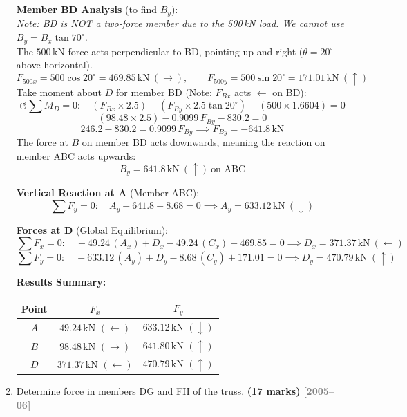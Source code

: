 \documentclass[12pt,a3paper]{article}
\newcommand{\yr}[1]{\hfill\textcolor{gray}{\small\textbf{[#1]}}}
\newcommand{\mk}[1]{\textcolor{orange!70!black}{\small\textbf{(#1 marks)}}}
\begin{document}
\begin{enumerate}
\begin{tcolorbox}[enhanced,breakable,ansbox,colback=cE!4,colframe=cE,
  boxrule=0.8pt,arc=5pt,
  title={\textbf{Corrected Solution}},fonttitle=\bfseries\color{white},colbacktitle=cE]
\medskip
\textbf{Member BD Analysis} (to find $B_y$): \\
\textit{Note: BD is NOT a two-force member due to the 500\,kN load. We cannot use $B_y = B_x \tan 70^\circ$.} \\
The $500$\,kN force acts perpendicular to BD, pointing up and right ($\theta = 20^\circ$ above horizontal).
\[
  F_{500x} = 500 \cos 20^\circ = 469.85\,\text{kN}\ (\rightarrow), \qquad
  F_{500y} = 500 \sin 20^\circ = 171.01\,\text{kN}\ (\uparrow)
\]
Take moment about $D$ for member BD (Note: $F_{Bx}$ acts $\leftarrow$ on BD):
\[
  \circlearrowleft \sum M_D = 0\colon\quad
  (F_{Bx} \times 2.5) - (F_{By} \times 2.5\tan 20^\circ) - (500 \times 1.6604) = 0
\]
\[
  (98.48 \times 2.5) - 0.9099\,F_{By} - 830.2 = 0
\]
\[
  246.2 - 830.2 = 0.9099\,F_{By} \implies F_{By} = -641.8\,\text{kN}
\]
The force at $B$ on member BD acts downwards, meaning the reaction on member ABC acts upwards:
\[
   \boxed{B_y = 641.8\,\text{kN}\ (\uparrow)\ \text{on ABC}}
\]

\medskip
\textbf{Vertical Reaction at A} (Member ABC):
\[
  \sum F_y = 0\colon\quad
  A_y + 641.8 - 8.68 = 0
  \implies \boxed{A_y = 633.12\,\text{kN}\ (\downarrow)}
\]

\medskip
\textbf{Forces at D} (Global Equilibrium):
\[
  \sum F_x = 0\colon\quad
  -49.24\,(A_x) + D_x - 49.24\,(C_x) + 469.85 = 0
  \implies \boxed{D_x = 371.37\,\text{kN}\ (\leftarrow)}
\]
\[
  \sum F_y = 0\colon\quad
  -633.12\,(A_y) + D_y - 8.68\,(C_y) + 171.01 = 0
  \implies \boxed{D_y = 470.79\,\text{kN}\ (\uparrow)}
\]

\medskip
\textbf{Results Summary:}
\begin{center}
\begin{tabular}{ccc}
\toprule
\textbf{Point} & $F_x$ & $F_y$\\
\midrule
$A$ & $49.24$\,kN $(\leftarrow)$  & $633.12$\,kN $(\downarrow)$\\
$B$ & $98.48$\,kN $(\rightarrow)$ & $641.80$\,kN $(\uparrow)$\\
$D$ & $371.37$\,kN $(\leftarrow)$ & $470.79$\,kN $(\uparrow)$\\
\bottomrule
\end{tabular}
\end{center}

\end{tcolorbox}

\item \label{qlabel:B2-Q28}
Determine force in members DG and FH of the truss. \mk{17}
\yr{2005--06}


\end{enumerate}
\end{document}
